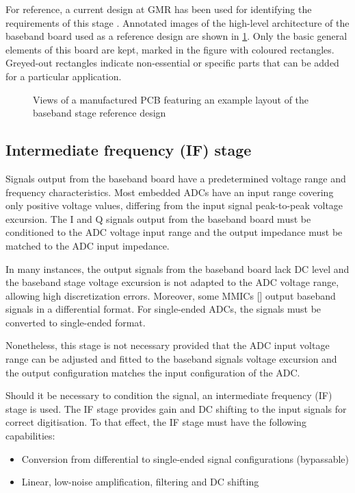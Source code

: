 For reference, a current design at GMR has been used for identifying the requirements of this stage \cite{Sardinero2022}. Annotated images of the high-level architecture of the baseband board used as a reference design are shown in \cref{fig:bb_board}. Only the basic general elements of this board are kept, marked in the figure with coloured rectangles. Greyed-out rectangles indicate non-essential or specific parts that can be added for a particular application.

\begin{figure}[ht]
	\centering
	\caption{Views of a manufactured PCB featuring an example layout of the baseband stage reference design \label{fig:bb_board}}
\end{figure}

\subsection{Intermediate frequency (IF) stage}

Signals output from the baseband board have a predetermined voltage range and frequency characteristics. Most embedded ADCs have an input range covering only positive voltage values, differing from the input signal peak-to-peak voltage excursion. The I and Q signals output from the baseband board must be conditioned to the ADC voltage input range and the output impedance must be matched to the ADC input impedance.

In many instances, the output signals from the baseband board lack DC level and the baseband stage voltage excursion is not adapted to the ADC voltage range, allowing high discretization errors. Moreover, some MMICs [\cite{Antolinos2020}] output baseband signals in a differential format. For single-ended ADCs, the signals must be converted to single-ended format.

Nonetheless, this stage is not necessary provided that the ADC input voltage range can be adjusted and fitted to the baseband signals voltage excursion and the output configuration matches the input configuration of the ADC.

Should it be necessary to condition the signal, an intermediate frequency (IF) stage is used. The IF stage provides gain and DC shifting to the input signals for correct digitisation. To that effect, the IF stage must have the following capabilities:
\begin{itemize}
	\item Conversion from differential to single-ended signal configurations (bypassable)
	\item Linear, low-noise amplification, filtering and DC shifting
\end{itemize}

